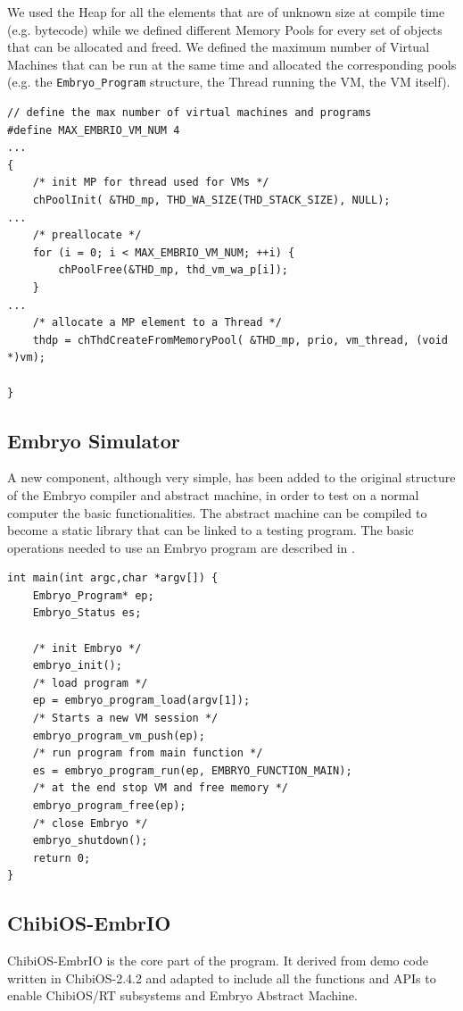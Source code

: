 \documentclass[a4paper,10pt]{article}
\begin{document}
\begin{multicols}{2}
We used the Heap for all the elements that are of unknown size at compile time (e.g. bytecode) while we defined different Memory Pools for every set of objects that can be allocated and freed. We defined the maximum number of Virtual Machines that can be run at the same time and allocated the corresponding pools (e.g. the \texttt{Embryo\_Program} structure, the Thread running the VM, the VM itself).
\smallskip
\begin{lstlisting}[caption={Memory Pools}]
// define the max number of virtual machines and programs
#define MAX_EMBRIO_VM_NUM 4
...
{
	/* init MP for thread used for VMs */
	chPoolInit( &THD_mp, THD_WA_SIZE(THD_STACK_SIZE), NULL);
...
	/* preallocate */
	for (i = 0; i < MAX_EMBRIO_VM_NUM; ++i) {
		chPoolFree(&THD_mp, thd_vm_wa_p[i]);
	}
...
	/* allocate a MP element to a Thread */
	thdp = chThdCreateFromMemoryPool( &THD_mp, prio, vm_thread, (void *)vm);

}
\end{lstlisting}

\subsection{Embryo Simulator}

A new component, although very simple, has been added to the original structure of the Embryo compiler and abstract machine, in order to test on a normal computer the basic functionalities. The abstract machine can be compiled to become a static library that can be linked to a testing program. The basic operations needed to use an Embryo program are described in \cite{embryoSite}.
\bigskip

\begin{lstlisting}[caption={Embryo basic simulator}]
int main(int argc,char *argv[]) {
	Embryo_Program* ep;
	Embryo_Status es;

	/* init Embryo */
	embryo_init();
	/* load program */
	ep = embryo_program_load(argv[1]);
	/* Starts a new VM session */
	embryo_program_vm_push(ep);
	/* run program from main function */
	es = embryo_program_run(ep, EMBRYO_FUNCTION_MAIN);
	/* at the end stop VM and free memory */
	embryo_program_free(ep);
	/* close Embryo */
	embryo_shutdown();
	return 0;
}

\end{lstlisting}

\subsection{ChibiOS-EmbrIO}
ChibiOS-EmbrIO is the core part of the program. It derived from demo code written in ChibiOS-2.4.2 and adapted to include all the functions and APIs to enable ChibiOS/RT subsystems and Embryo Abstract Machine.


\end{multicols}
\end{document}
